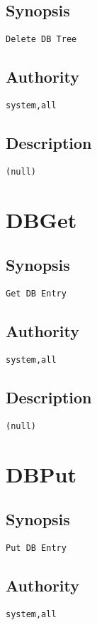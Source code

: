 \subsection{Synopsis}
\begin{verbatim}
Delete DB Tree
\end{verbatim}
\subsection{Authority}
\begin{verbatim}
system,all
\end{verbatim}
\subsection{Description}
\begin{verbatim}
(null)
\end{verbatim}


\section{DBGet}
\subsection{Synopsis}
\begin{verbatim}
Get DB Entry
\end{verbatim}
\subsection{Authority}
\begin{verbatim}
system,all
\end{verbatim}
\subsection{Description}
\begin{verbatim}
(null)
\end{verbatim}


\section{DBPut}
\subsection{Synopsis}
\begin{verbatim}
Put DB Entry
\end{verbatim}
\subsection{Authority}
\begin{verbatim}
system,all
\end{verbatim}
